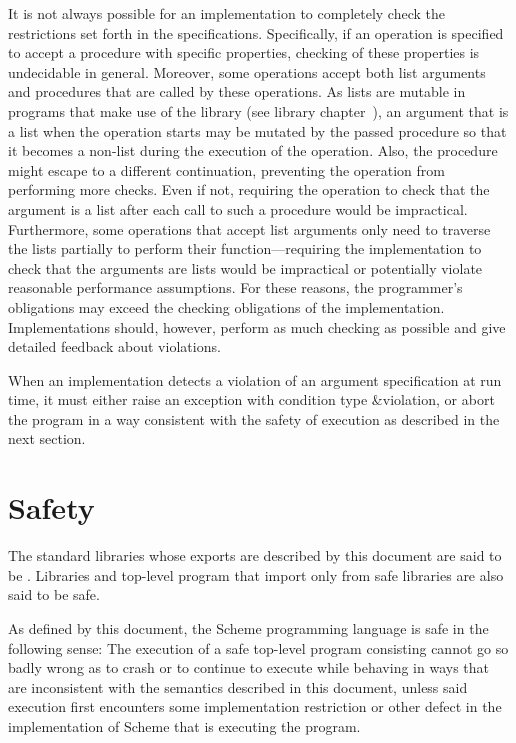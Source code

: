 It is not always possible for an implementation to completely check
the restrictions set forth in the specifications.  Specifically, if an
operation is specified to accept a procedure with specific properties,
checking of these properties is undecidable in general.  Moreover,
some operations accept both list arguments and procedures that are
called by these operations.  As lists are mutable in programs that
make use of the  library (see library
chapter~), an argument that is a list
when the operation starts may be mutated by the passed procedure so
that it becomes a non-list during the execution of the operation.
Also, the procedure might escape to a different continuation,
preventing the operation from performing more checks.
Even if not, requiring the operation to check that the argument is a list after
each call to such a procedure would be impractical.  Furthermore, some
operations that accept list arguments only need to traverse the lists
partially to perform their function---requiring the implementation to
check that the arguments are lists would be impractical or potentially
violate reasonable performance assumptions.  For these reasons, the
programmer's obligations may exceed the checking obligations of the
implementation.  Implementations should, however, perform
as much checking as possible and give detailed feedback about
violations.

When an implementation detects a violation of an argument
specification at run time, it must either raise an exception with
condition type {\cf\&violation}, or abort the program in a way
consistent with the safety of execution as described in the next
section.

\section{Safety}
\label{safeunsafemodesection}

The standard libraries whose exports are described by this document
are said to be .  Libraries and top-level
program that import only from safe libraries are also said to be safe.

As defined by this document, the Scheme programming language
is safe in the following sense:
The execution of a safe top-level program consisting
cannot go so badly wrong as to crash or to continue to
execute while behaving in ways that are
inconsistent with the semantics described in this document,
unless said execution first encounters some implementation
restriction or other defect in the implementation of Scheme
that is executing the program.

